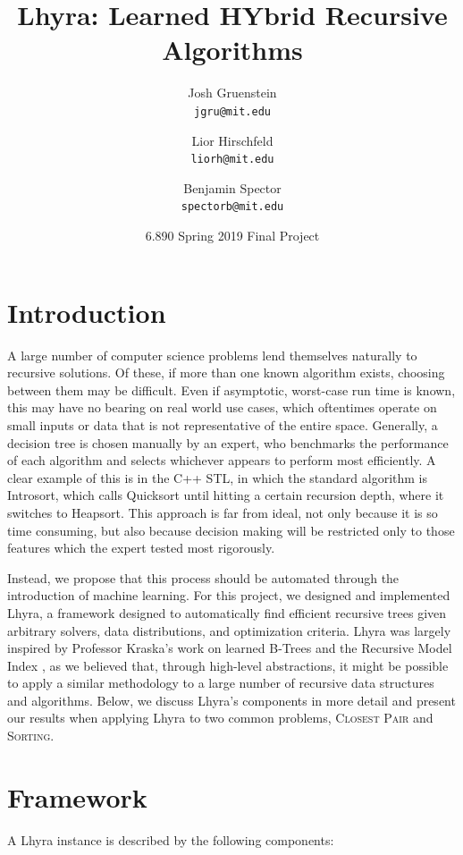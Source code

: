 \documentclass{article}
\title{Lhyra: Learned HYbrid Recursive Algorithms}
\author{
    Josh Gruenstein\\\texttt{jgru@mit.edu} \and Lior Hirschfeld\\\texttt{liorh@mit.edu} \and
    Benjamin Spector\\\texttt{spectorb@mit.edu}
}
\date{6.890 Spring 2019 Final Project}
\begin{document}
\maketitle

\section{Introduction}
A large number of computer science problems lend themselves naturally to recursive solutions. Of these, if more than one known algorithm exists, choosing between them may be difficult. Even if asymptotic, worst-case run time is known, this may have no bearing on real world use cases, which oftentimes operate on small inputs or data that is not representative of the entire space. Generally, a decision tree is chosen manually by an expert, who benchmarks the performance of each algorithm and selects whichever appears to perform most efficiently. A clear example of this is in the C++ STL, in which the standard algorithm is Introsort, which calls Quicksort until hitting a certain recursion depth, where it switches to Heapsort. This approach is far from ideal, not only because it is so time consuming, but also because decision making will be restricted only to those features which the expert tested most rigorously. 

Instead, we propose that this process should be automated through the introduction of machine learning. For this project, we designed and implemented Lhyra, a framework designed to automatically find efficient recursive trees given arbitrary solvers, data distributions, and optimization criteria. Lhyra was largely inspired by Professor Kraska's work on learned B-Trees and the Recursive Model Index \cite{kraska}, as we believed that, through high-level abstractions, it might be possible to apply a similar methodology to a large number of recursive data structures and algorithms. Below, we discuss Lhyra's components in more detail and present our results when applying Lhyra to two common problems, \textsc{Closest Pair} and \textsc{Sorting}.


\section{Framework}
A Lhyra instance is described by the following components:
\end{document}
